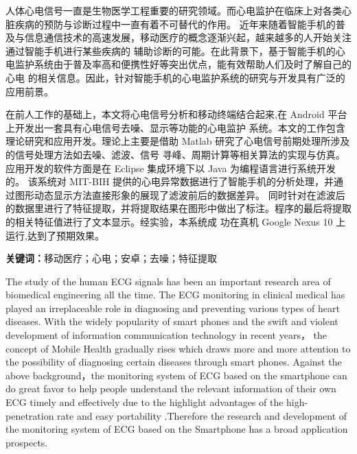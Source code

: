 \cleardoublepage
{}
人体心电信号一直是生物医学工程重要的研究领域。而心电监护在临床上对各类心脏疾病的预防与诊断过程中一直有着不可替代的作用。
近年来随着智能手机的普及与信息通信技术的高速发展，移动医疗的概念逐渐兴起，越来越多的人开始关注通过智能手机进行某些疾病的
辅助诊断的可能。在此背景下，基于智能手机的心电监护系统由于普及率高和便携性好等突出优点，能有效帮助人们及时了解自己的心电
的相关信息。因此，针对智能手机的心电监护系统的研究与开发具有广泛的应用前景。

在前人工作的基础上，本文将心电信号分析和移动终端结合起来,在 Android 平台上开发出一套具有心电信号去噪、显示等功能的心电监护
系统。本文的工作包含理论研究和应用开发。理论上主要是借助 Matlab 研究了心电信号前期处理所涉及的信号处理方法如去噪、滤波、信号
寻峰、周期计算等相关算法的实现与仿真。应用开发的软件方面是在 Eclipse 集成环境下以 Java 为编程语言进行系统开发的。
该系统对 MIT-BIH 提供的心电异常数据进行了智能手机的分析处理，并通过图形动态显示方法直接形象的展现了滤波前后的数据差异。
同时针对在滤波后的数据里进行了特征提取，并将提取结果在图形中做出了标注。程序的最后将提取的相关特征值进行了文本显示。经实验，本系统成
功在真机 Google Nexus 10 上运行,达到了预期效果。

\textbf{关键词：}移动医疗；心电；安卓；去噪；特征提取

\cleardoublepage
{}
The study of the human ECG signals has been an important research area of biomedical
engineering all the time. The ECG monitoring in clinical medical has played an irreplaceable
role in diagnosing and preventing various types of heart diseases. With the widely popularity
of smart phones and the swift and violent development of information communication
technology in recent years， the concept of Mobile Health gradually rises which draws more
and more attention to the possibility of diagnosing certain diseases through smart phones.
Against the above background，the monitoring system of ECG based on the smartphone can
do great favor to help people understand the relevant information of their own ECG timely
and effectively due to the highlight advantages of the high-penetration rate and easy
portability .Therefore the research and development of the monitoring system of ECG based
on the Smartphone has a broad application prospects.

